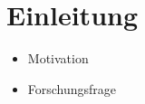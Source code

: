 \chapter{Einleitung}\label{ch:introduction}
\begin{itemize}
    \item Motivation 
    \item Forschungsfrage
\end{itemize}

% 
